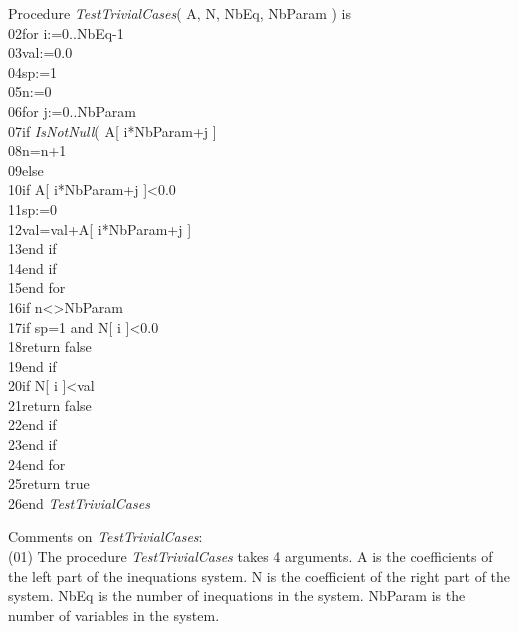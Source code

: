 \documentclass[12pt, a4paper]{article}
\begin{document}
\begin{ttfamily}
\quad Procedure {\em TestTrivialCases}( A, N, NbEq, NbParam ) is\\
02\quad\quad for i:=0..NbEq-1\\
03\quad\quad\quad val:=0.0\\
04\quad\quad\quad sp:=1\\
05\quad\quad\quad n:=0\\
06\quad\quad\quad for j:=0..NbParam\\
07\quad\quad\quad\quad if {\em IsNotNull}( A[ i*NbParam+j ]\\
08\quad\quad\quad\quad\quad n=n+1\\
09\quad\quad\quad\quad else\\
10\quad\quad\quad\quad\quad if A[ i*NbParam+j ]<0.0\\
11\quad\quad\quad\quad\quad\quad sp:=0\\
12\quad\quad\quad\quad\quad\quad val=val+A[ i*NbParam+j ]\\
13\quad\quad\quad\quad\quad end if\\
14\quad\quad\quad\quad end if\\
15\quad\quad\quad end for\\
16\quad\quad\quad if n<>NbParam\\
17\quad\quad\quad\quad if sp=1 and N[ i ]<0.0\\
18\quad\quad\quad\quad\quad return false\\
19\quad\quad\quad\quad end if\\
20\quad\quad\quad\quad if N[ i ]<val\\
21\quad\quad\quad\quad\quad return false\\
22\quad\quad\quad\quad end if\\
23\quad\quad\quad end if\\
24\quad\quad end for\\
25\quad\quad return true\\
26\quad end {\em TestTrivialCases}\\
\end{ttfamily}

Comments on {\em TestTrivialCases}:\\

(01) The procedure {\em TestTrivialCases} takes 4 arguments. A is the coefficients of the left part of the inequations system. N is the coefficient of the right part of the system. NbEq is the number of inequations in the system. NbParam is the number of variables in the system.
\end{document}
